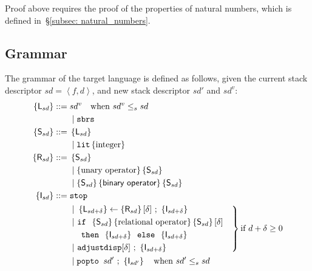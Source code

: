 \documentclass[12pt,a4paper]{report}
\theoremstyle{definition}
\newcommand{\secref}[1]{\S\ref{#1}}
\newcommand{\bracket}[1]{\left\{ #1 \right\}}
\newcommand{\ang}[1]{\left\langle #1 \right\rangle}
\begin{document}
    Proof above requires the proof of the properties of natural numbers, which is defined in~\secref{subsec: natural_numbers}.
    

    \subsection{Grammar}
    The grammar of the target language is defined as follows, given the current stack descriptor $sd = \ang{f, d}$, and new stack descriptor $sd'$ and $sd^v$:
    \[\begin{aligned}
        \bracket{\textsf{L}_{sd}} ::={}& sd^v \quad \text{when } sd^v \leq_s sd \\
                        &\mid \texttt{sbrs}  \\
        \bracket{\textsf{S}_{sd}} ::={}& \bracket{\textsf{L}_{sd}} \\
                        &\mid \texttt{lit} \bracket{\text{integer}} \\
        \bracket{\textsf{R}_{sd}} ::={}& \bracket{\textsf{S}_{sd}} \\
                        &\mid \bracket{ \text{unary operator} } \bracket{ \textsf{S}_{sd}}\\
                        &\mid \bracket{\textsf{S}_{sd}} \bracket{\textsf{binary operator}} \bracket{ \textsf{S}_{sd} } \\
        \bracket{\textsf{I}_{sd}} ::={}& \texttt{stop} \\
                        &\left.
                        \begin{aligned}
                        &|{\ } \bracket{\textsf{L}_{sd+\delta}} \gets \bracket{\textsf{R}_{sd}}[\delta] \text{ ; } \bracket{\textsf{I}_{sd+\delta}} \\
                        &|{\ } \texttt{if } \bracket{\textsf{S}_{sd}} \bracket{\text{relational operator}} \bracket{\textsf{S}_{sd}}[\delta] \\
                        & \hphantom{\mid {}} \texttt{ then } \bracket{\textsf{I}_{sd+\delta}} \texttt{ else } \bracket{\textsf{I}_{sd+\delta}} \\
                        &|{\ } \texttt{adjustdisp} [\delta] \text{ ; } \bracket{\textsf{I}_{sd+\delta}} \\
                        \end{aligned}
                        \quad \right\} \text{if } d + \delta \geq 0  \\
                        &{}\mid{} \texttt{popto } sd' \text{ ; } \bracket{\textsf{I}_{sd'}} \quad \text{when } sd' \leq_s sd \\
    \end{aligned}\]
\end{document}
